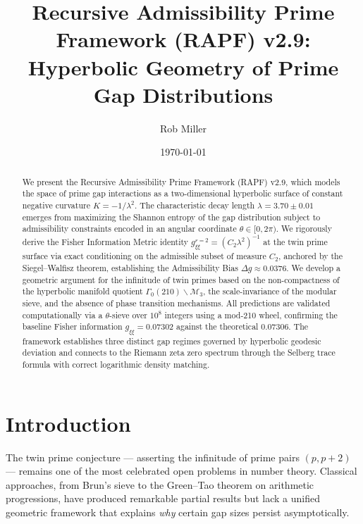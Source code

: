 \documentclass[12pt]{article}
\title{Recursive Admissibility Prime Framework (RAPF) v2.9:\\
Hyperbolic Geometry of Prime Gap Distributions}
\author{Rob Miller}
\date{\today}
\begin{document}
\maketitle

\begin{abstract}
We present the Recursive Admissibility Prime Framework (RAPF) v2.9, which
models the space of prime gap interactions as a two-dimensional hyperbolic
surface of constant negative curvature $K = -1/\lambda^2$. The characteristic
decay length $\lambda = 3.70 \pm 0.01$ emerges from maximizing the Shannon
entropy of the gap distribution subject to admissibility constraints encoded
in an angular coordinate $\theta \in [0, 2\pi)$. We rigorously derive the
Fisher Information Metric identity $g_{\xi\xi}^{r=2} = (C_2 \lambda^2)^{-1}$
at the twin prime surface via exact conditioning on the admissible subset
of measure $C_2$, anchored by the Siegel--Walfisz theorem, establishing the
Admissibility Bias $\Delta g \approx 0.0376$. We develop a geometric argument
for the infinitude of twin primes based on the non-compactness of the
hyperbolic manifold quotient $\Gamma_0(210) \backslash \mathcal{M}_3$, the
scale-invariance of the modular sieve, and the absence of phase transition
mechanisms. All predictions are validated computationally via a $\theta$-sieve
over $10^8$ integers using a mod-210 wheel, confirming the baseline Fisher
information $g_{\xi\xi} = 0.07302$ against the theoretical $0.07306$. The
framework establishes three distinct gap regimes governed by hyperbolic
geodesic deviation and connects to the Riemann zeta zero spectrum through the
Selberg trace formula with correct logarithmic density matching.
\end{abstract}

\tableofcontents
\newpage

\section{Introduction}

The twin prime conjecture --- asserting the infinitude of prime pairs $(p, p+2)$
--- remains one of the most celebrated open problems in number theory. Classical
approaches, from Brun's sieve to the Green--Tao theorem on arithmetic progressions,
have produced remarkable partial results but lack a unified geometric framework that
explains \textit{why} certain gap sizes persist asymptotically.
\end{document}

